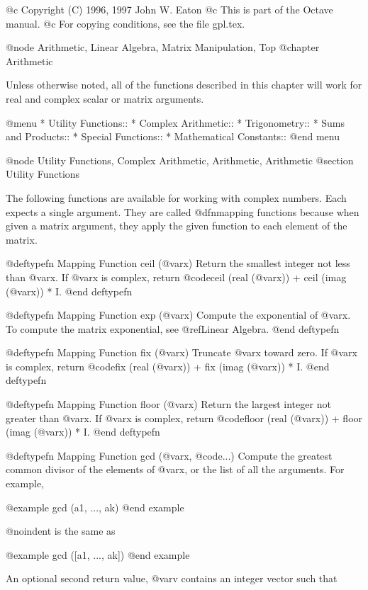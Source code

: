 @c Copyright (C) 1996, 1997 John W. Eaton
@c This is part of the Octave manual.
@c For copying conditions, see the file gpl.tex.

@node Arithmetic, Linear Algebra, Matrix Manipulation, Top
@chapter Arithmetic

Unless otherwise noted, all of the functions described in this chapter
will work for real and complex scalar or matrix arguments.

@menu
* Utility Functions::           
* Complex Arithmetic::          
* Trigonometry::                
* Sums and Products::           
* Special Functions::           
* Mathematical Constants::      
@end menu

@node Utility Functions, Complex Arithmetic, Arithmetic, Arithmetic
@section Utility Functions

The following functions are available for working with complex numbers.
Each expects a single argument.  They are called @dfn{mapping functions}
because when given a matrix argument, they apply the given function to
each element of the matrix.

@deftypefn {Mapping Function} {} ceil (@var{x})
Return the smallest integer not less than @var{x}.  If @var{x} is
complex, return @code{ceil (real (@var{x})) + ceil (imag (@var{x})) * I}.
@end deftypefn

@deftypefn {Mapping Function} {} exp (@var{x})
Compute the exponential of @var{x}.  To compute the matrix exponential,
see @ref{Linear Algebra}.
@end deftypefn

@deftypefn {Mapping Function} {} fix (@var{x})
Truncate @var{x} toward zero.  If @var{x} is complex, return
@code{fix (real (@var{x})) + fix (imag (@var{x})) * I}.
@end deftypefn

@deftypefn {Mapping Function} {} floor (@var{x})
Return the largest integer not greater than @var{x}.  If @var{x} is
complex, return @code{floor (real (@var{x})) + floor (imag (@var{x})) * I}.
@end deftypefn

@deftypefn {Mapping Function} {} gcd (@var{x}, @code{...})
Compute the greatest common divisor of the elements of @var{x}, or the
list of all the arguments.  For example, 

@example
gcd (a1, ..., ak)
@end example

@noindent
is the same as

@example
gcd ([a1, ..., ak])
@end example

An optional second return value, @var{v}
contains an integer vector such that

